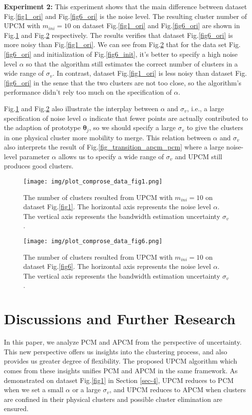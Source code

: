 \documentclass[journal,transmag]{IEEEtran}
\theoremstyle{definition}
\begin{document}
\textbf{Experiment 2:} This experiment shows that the main difference between dataset Fig.\ref{fig1_ori} and Fig.\ref{fig6_ori} is the noise level.
The resulting cluster number of UPCM with $m_{ini}=10$ on dataset Fig.\ref{fig1_ori} and Fig.\ref{fig6_ori} are shown in Fig.\ref{fig1_comprose} and Fig.\ref{fig6_comprose} respectively. The results verifies that dataset Fig.\ref{fig6_ori} is more noisy than Fig.\ref{fig1_ori}.
We can see from Fig.\ref{fig6_comprose} that for the data set Fig.\ref{fig6_ori} and initialization of Fig.\ref{fig6_init}, it's better to specify a high noise level $\alpha$ so that the algorithm still estimates the correct number of clusters in a wide range of $\sigma_v$. In contrast, dataset Fig.\ref{fig1_ori} is less noisy than dataset Fig.\ref{fig6_ori} in the sense that the two clusters are not too close, so the algorithm's performance didn't rely too much on the specification of $\alpha$.

Fig.\ref{fig1_comprose} and Fig.\ref{fig6_comprose} also illustrate the interplay between $\alpha$ and $\sigma_v$, i.e., a large specification of noise level $\alpha$ indicate that fewer points are actually contributed to the adaption of prototype $\boldsymbol{\theta}_j$, so we should specify a large $\sigma_v$ to give the clusters in one physical cluster more mobility to merge. This relation between $\alpha$ and $\sigma_v$ also interprets the result of
Fig.\ref{fig_transition_apcm_pcm} where a large noise-level parameter $\alpha$ allows us to specify a wide range of $\sigma_v$ and UPCM still produces good clusters.
\begin{figure}[htb]
\centering
\texttt{[image: img/plot\_comprose\_data\_fig1.png]}
\caption{\label{fig1_comprose}The number of clusters resulted from UPCM with $m_{ini}=10$ on dataset Fig.\ref{fig1}. The horizontal axis represents the noise level $\alpha$. The vertical axis represents the bandwidth estimation uncertainty $\sigma_v$.}
\end{figure}
\begin{figure}[htb]
\centering
\texttt{[image: img/plot\_comprose\_data\_fig6.png]}
\caption{\label{fig6_comprose}The number of clusters resulted from UPCM with $m_{ini}=10$ on dataset Fig.\ref{fig6}. The horizontal axis represents the noise level $\alpha$. The vertical axis represents the bandwidth estimation uncertainty $\sigma_v$.}
\end{figure}

\section{Discussions and Further Research}
\label{sec-5}
In this paper, we analyze PCM and APCM from the perspective of uncertainty. This new perspective offers us insights into the clustering process, and also provides us greater degree of flexibility.
The proposed UPCM algorithm which comes from these insights unifies PCM and APCM in the same framework. As demonstrated on dataset Fig.\ref{fig1} in Section \ref{sec-4}, UPCM reduces to PCM when we set a small $\alpha$ or a large $\sigma_v$, and UPCM reduces to APCM when clusters are confined in their physical clusters and possible cluster elimination are ensured.
\end{document}
